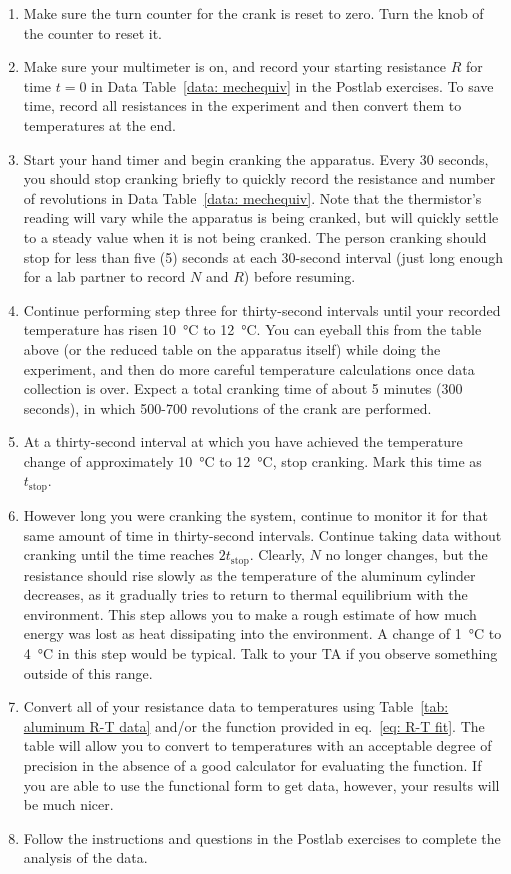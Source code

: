 \documentclass[addpoints]{physlabs}
\begin{document}
\begin{labsection}
\begin{experiment}
\begin{enumerate}
    \item Make sure the turn counter for the crank is reset to zero. Turn the knob of the counter to reset it.
    \item Make sure your multimeter is on, and record your starting resistance $R$ for time $t=0$ in Data Table~\ref{data: mechequiv} in the Postlab exercises. To save time, record all resistances in the experiment and then convert them to temperatures at the end.
    \item Start your hand timer and begin cranking the apparatus. Every 30 seconds, you should stop cranking briefly to quickly record the resistance and number of revolutions in Data Table~\ref{data: mechequiv}. Note that the thermistor's reading will vary while the apparatus is being cranked, but will quickly settle to a steady value when it is not being cranked. The person cranking should stop for less than five (5) seconds at each 30-second interval (just long enough for a lab partner to record $N$ and $R$) before resuming.
    \item Continue performing step three for thirty-second intervals until your recorded temperature has risen \qty{10}{\celsius} to \qty{12}{\celsius}. You can eyeball this from the table above (or the reduced table on the apparatus itself) while doing the experiment, and then do more careful temperature calculations once data collection is over. Expect a total cranking time of about 5 minutes (300 seconds), in which 500-700 revolutions of the crank are performed.
    \item At a thirty-second interval at which you have achieved the temperature change of approximately \qty{10}{\celsius} to \qty{12}{\celsius}, stop cranking. Mark this time as $t_\text{stop}$.
    \item However long you were cranking the system, continue to monitor it for that same amount of time in thirty-second intervals. Continue taking data without cranking until the time reaches $2t_\text{stop}$. Clearly, $N$ no longer changes, but the resistance should rise slowly as the temperature of the aluminum cylinder decreases, as it gradually tries to return to thermal equilibrium with the environment. This step allows you to make a rough estimate of how much energy was lost as heat dissipating into the environment. A change of \qty{1}{\celsius} to \qty{4}{\celsius} in this step would be typical. Talk to your TA if you observe something outside of this range.
    \item Convert all of your resistance data to temperatures using Table~\ref{tab: aluminum R-T data} and/or the function provided in eq.~\ref{eq: R-T fit}. The table will allow you to convert to temperatures with an acceptable degree of precision in the absence of a good calculator for evaluating the function. If you are able to use the functional form to get data, however, your results will be much nicer.
    \item Follow the instructions and questions in the Postlab exercises to complete the analysis of the data.
\end{enumerate}


\end{experiment}
\end{labsection}
\end{document}
